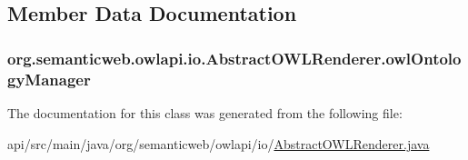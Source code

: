 \subsection{Member Data Documentation}
\hypertarget{classorg_1_1semanticweb_1_1owlapi_1_1io_1_1_abstract_o_w_l_renderer_abb9888586f19a7a923cba542d99f1556}{
\subsubsection[{owl\-Ontology\-Manager}]{ org.\-semanticweb.\-owlapi.\-io.\-Abstract\-O\-W\-L\-Renderer.\-owl\-Ontology\-Manager\hspace{0.3cm}{\ttfamily [private]}}}\label{classorg_1_1semanticweb_1_1owlapi_1_1io_1_1_abstract_o_w_l_renderer_abb9888586f19a7a923cba542d99f1556}


The documentation for this class was generated from the following file\-:\begin{DoxyCompactItemize}
\item 
api/src/main/java/org/semanticweb/owlapi/io/\hyperlink{_abstract_o_w_l_renderer_8java}{Abstract\-O\-W\-L\-Renderer.\-java}\end{DoxyCompactItemize}
